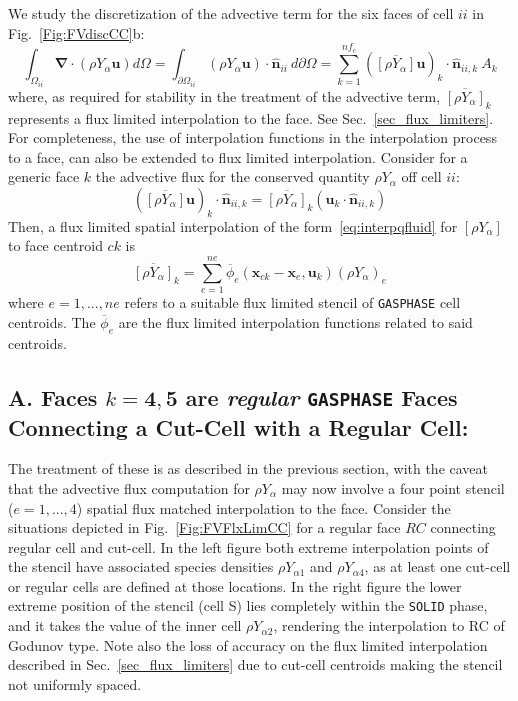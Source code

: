 We study the discretization of the advective term for the six faces of cell $ii$ in Fig.~\ref{Fig:FVdiscCC}b:
%
\begin{equation}
  \int_{\Omega_{ii}} { \boldsymbol{\nabla} \cdot  \left(  \rho Y_\alpha \mathbf{u} \right) } d \Omega =
  \int_{\partial \Omega_{ii}} { \left( \rho Y_\alpha \mathbf{u} \right) \cdot \hat{\mathbf{n}}_{ii} } \: d \partial \Omega =
  \sum^{nf_c}_{k=1} \left(  \overline{[\rho Y_\alpha]} \mathbf{u} \right)_k \cdot \hat{\mathbf{n}}_{ii,k} \: A_k \label{eq:fvadv}
\end{equation}
%
where, as required for stability in the treatment of the advective term, $\overline{[\rho Y_\alpha]}_k$ represents a flux limited interpolation to the face. See Sec.~\ref{sec_flux_limiters}. For completeness, the use of interpolation functions in the interpolation process to a face, can also be extended to flux limited interpolation. Consider for a generic face $k$ the advective flux for the conserved quantity $\rho Y_\alpha$ off cell $ii$:
%
\begin{equation}   
    \left(  \overline{[\rho Y_\alpha]} \mathbf{u} \right)_k \cdot \hat{\mathbf{n}}_{ii,k}  = \overline{[\rho Y_\alpha]}_k \left(  \mathbf{u}_k \cdot \hat{\mathbf{n}}_{ii,k} \right) 
\end{equation}
%
Then, a flux limited spatial interpolation of the form~\eqref{eq:interpqfluid} for $[\rho Y_\alpha]$ to face centroid $ck$ is
%
\begin{equation}
  \overline{[\rho Y_\alpha]}_k = \sum^{ne}_{e=1} \overline{\phi}_e(\mathbf{x}_{ck}-\mathbf{x}_e, \mathbf{u}_k) \left( \rho Y_{\alpha} \right)_e
\end{equation}
%
where $e=1,...,ne$ refers to a suitable flux limited stencil of \texttt{GASPHASE} cell centroids. The $\overline{\phi}_e$ are the flux limited interpolation functions  related to said centroids.

\subsection*{A. Faces $k=\mathbf{4},\mathbf{5}$ are \textit{regular} \texttt{GASPHASE} Faces Connecting a Cut-Cell with a Regular Cell:}
The treatment of these is as described in the previous section, with the caveat that the advective flux computation for $\rho Y_\alpha$ may now involve a four point stencil ($e=1,...,4$) spatial flux matched interpolation to the face. Consider the situations depicted in Fig.~\ref{Fig:FVFlxLimCC} for a regular face $RC$ connecting regular cell and cut-cell. In the left figure both extreme interpolation points of the stencil have associated species densities $\rho Y_{\alpha 1}$ and $\rho Y_{\alpha 4}$, as at least one cut-cell or regular cells are defined at those locations. In the right figure the lower extreme position of the stencil (cell S) lies completely within the \texttt{SOLID} phase, and it takes the value of the inner cell $\rho Y_{\alpha 2}$, rendering the interpolation to RC of Godunov type. Note also the loss of accuracy on the flux limited interpolation described in Sec.~\ref{sec_flux_limiters} due to cut-cell centroids making the stencil not uniformly spaced.
 
